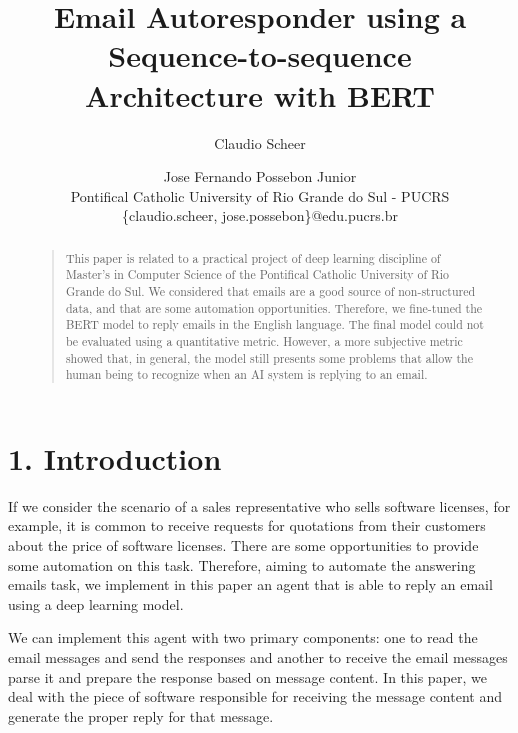 \documentclass[letterpaper]{article}
\begin{document}
%
\title{Email Autoresponder using a Sequence-to-sequence\\Architecture with BERT}
\author{Claudio Scheer \and Jose Fernando Possebon Junior\\
    Pontifical Catholic University of Rio Grande do Sul - PUCRS\\
    \{claudio.scheer, jose.possebon\}@edu.pucrs.br
}

\maketitle

\begin{abstract}
    \begin{quote}
        This paper is related to a practical project of deep learning discipline of Master's in Computer Science of the Pontifical Catholic University of Rio Grande do Sul. We considered that emails are a good source of non-structured data, and that are some automation opportunities. Therefore, we fine-tuned the BERT model to reply emails in the English language. The final model could not be evaluated using a quantitative metric. However, a more subjective metric showed that, in general, the model still presents some problems that allow the human being to recognize when an AI system is replying to an email.
    \end{quote}
\end{abstract}


\section{1. Introduction}

If we consider the scenario of a sales representative who sells software licenses, for example, it is common to receive requests for quotations from their customers about the price of software licenses. There are some opportunities to provide some automation on this task. Therefore, aiming to automate the answering emails task, we implement in this paper an agent that is able to reply an email using a deep learning model.

We can implement this agent with two primary components: one to read the email messages and send the responses and another to receive the email messages parse it and prepare the response based on message content. In this paper, we deal with the piece of software responsible for receiving the message content and generate the proper reply for that message.
\end{document}

